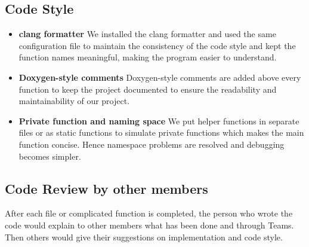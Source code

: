 \documentclass{article}
\begin{document}
\subsection{Code Style}
    \begin{itemize}
        \item \textbf{clang formatter}
        We installed the clang formatter and used the same configuration file to maintain the consistency of the code style and kept the function names meaningful, making the program easier to understand. 
         \item \textbf{Doxygen-style comments}
        Doxygen-style comments are added above every function to keep the project documented to ensure the readability and maintainability of our project.
        \item \textbf{Private function and naming space}
         We put helper functions in separate files or as static functions to simulate private functions which makes the main function concise. Hence namespace problems are resolved and debugging becomes simpler. 
    \end{itemize}

\subsection{Code Review by other members}
    After each file or complicated function is completed, the person who wrote the code would explain to other members what has been done and through Teams. Then others would give their suggestions on implementation and code style.      
\end{document}
